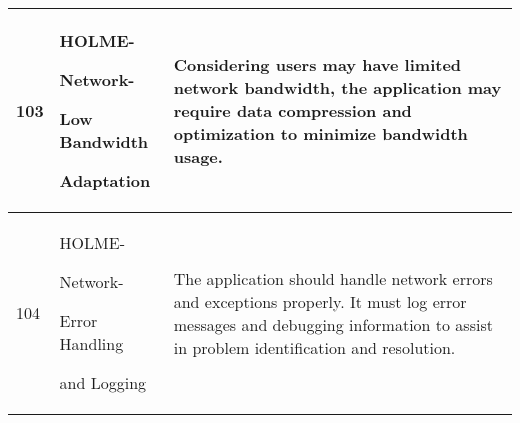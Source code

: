 \documentclass[conference]{IEEEtran}
\begin{document}
\begin{enumerate}
\begin{table}[h]
\begin{tabular}{|p{1cm}|p{1.8cm}|p{5.0cm}|}
         103 \par  & HOLME-\par Network-\par Low Bandwidth \par Adaptation  & Considering users may have limited network bandwidth, the application may require data compression and optimization to minimize bandwidth usage.\\ \hline
         104 \par  & HOLME-\par Network-\par Error Handling \par and Logging  & The application should handle network errors and exceptions properly. It must log error messages and debugging information to assist in problem identification and resolution.\\ \hline
    \end{tabular}
\end{table}


\end{enumerate}
\end{document}
